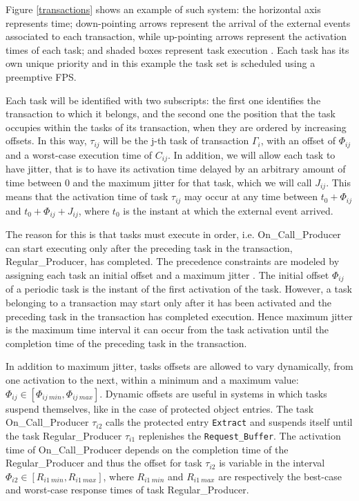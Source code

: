 \documentclass{article}
\begin{document}
Figure \ref{transactions} shows an example of such system: the horizontal axis represents time; down-pointing arrows represent the arrival of the external events associated to each transaction, while up-pointing arrows represent the activation times of each task; and shaded boxes represent task execution \cite{pessimistic-rma}. Each task has its own unique priority and in this example the task set is scheduled using a preemptive FPS.

Each task will be identified with two subscripts: the first one identifies the transaction to which it belongs, and the second one the position that the task occupies within the tasks of its transaction, when they are ordered by increasing offsets. In this way, $\tau_{ij}$ will be the j-th task of transaction $\Gamma_i$, with an offset of $\Phi_{ij}$ and a worst-case execution time of $C_{ij}$. In addition, we will allow each task to have jitter, that is to have its activation time delayed by an arbitrary amount of time between 0 and the maximum jitter for that task, which we will call $J_{ij}$. This means that the activation time of task $\tau_{ij}$ may occur at any time between $t_0 + \Phi_{ij}$ and $t_0 + \Phi_{ij} + J_{ij}$, where $t_0$ is the instant at which the external event arrived.

The reason for this is that tasks must execute in order, i.e. On\_Call\_Producer can start executing only after the preceding task in the transaction, Regular\_Producer, has completed. The precedence constraints are modeled by assigning each task an initial offset and a maximum jitter \cite{tindell-offsets}. The initial offset $\Phi_{ij}$ of a periodic task is the instant of the first activation of the task. However, a task belonging to a transaction may start only after it has been activated and the preceding task in the transaction has completed execution. Hence maximum jitter is the maximum time interval it can occur from the task activation until the completion time of the preceding task in the transaction.

In addition to maximum jitter, tasks offsets are allowed to vary dynamically, from one activation to the next, within a minimum and a maximum value: $\Phi_{ij} \in [\Phi_{ij\ min}, \Phi_{ij\ max}]$. Dynamic offsets are useful in systems in which tasks suspend themselves, like in the case of protected object entries. The task On\_Call\_Producer $\tau_{i2}$ calls the protected entry \texttt{Extract} and suspends itself until the task Regular\_Producer $\tau_{i1}$ replenishes the \texttt{Request\_Buffer}. The activation time of On\_Call\_Producer depends on the completion time of the Regular\_Producer and thus the offset for task $\tau_{i2}$ is variable in the interval $\Phi_{i2} \in [R_{i1\ min}, R_{i1\ max}]$, where $R_{i1\ min}$ and $R_{i1\ max}$ are respectively the best-case and worst-case response times of task Regular\_Producer.
\end{document}

